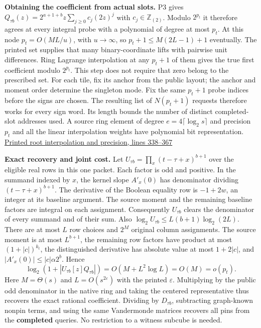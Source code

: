 \documentclass[11pt,a4paper]{article}
\begin{document}
\textbf{Obtaining the coefficient from actual slots.} P3 gives
\(Q_{\tau b}(z)=2^{a+1+b}z\sum_{j\ge0}c_j(2z)^j\) with
\(c_j\in\mathbb Z_{(2)}\). Modulo \(2^{p_t}\) it therefore agrees at
every integral probe with a polynomial of degree at most \(p_t\). At
this node \(p_t=O(ML/u)\), with \(u\to\infty\), so
\(p_t+1\le M(2L-1)+1\) eventually. The printed set supplies that many
binary-coordinate lifts with pairwise unit differences. Ring Lagrange
interpolation at any \(p_t+1\) of them gives the true first coefficient
modulo \(2^{p_t}\). This step does not require that zero belong to the
prescribed set. For each tile, fix its anchor from the public layout;
the anchor and moment order determine the singleton mode. Fix the same
\(p_t+1\) probe indices before the signs are chosen. The resulting list of
\(N(p_t+1)\) requests therefore works for every sign word. Its length
bounds the number of distinct completed-slot addresses used. A source ring element of degree
\(e=4\lceil\log_2s\rceil\) and precision \(p_t\) and all the linear
interpolation weights have polynomial bit representation.
\href{https://github.com/openai/math/blob/main/preprints/The-Exponential-Time-Hypothesis-is-False-October-25-2026/build/quantitative-contraction.tex\#L338}{Printed
root interpolation and precision, lines 338--367}

\textbf{Exact recovery and joint cost.} Let
\(U_{\tau b}=\prod_x(t-\tau+x)^{b+1}\) over the eligible real rows in
this one packet. Each factor is odd and positive. In the summand
indexed by \(x\), the kernel slope \(A'_x(0)\) has denominator dividing
\((t-\tau+x)^{b+1}\). The derivative of the Boolean equality row is
\(-1+2w\), an integer at its baseline argument. The source moment and
the remaining baseline factors are integral on each assignment.
Consequently \(U_{\tau b}\) clears the denominator of every summand
and of their sum. Also
\(\log_2 U_{\tau b}\le L(b+1)\log_2(2L)\). There are at most \(L\) row
choices and \(2^M\) original column assignments. The source moment is at
most \(L^{b+1}\), the remaining row factors have product at most
\((1+|c|)^{k_t}\), the distinguished derivative has absolute value at
most \(1+2|c|\), and \(|A'_x(0)|\le |c|\alpha 2^b\). Hence \[
  \log_2\!\left(1+\left|U_{\tau b}[z]Q_{\tau b}\right|\right)
          =O(M+L^2\log L)=O(M)=o(p_t).
\] Here \(M=\Theta(s)\) and \(L=O(s^{2\varepsilon})\) with the printed
\(\varepsilon\). Multiplying by the public odd denominator in the native
ring and taking the centered representative thus recovers the exact
rational coefficient. Dividing by \(D_{\tau b}\), subtracting
graph-known nonpin terms, and using the same Vandermonde matrices
recovers all pins from the \textbf{completed} queries. No restriction to
a witness subcube is needed.
\end{document}
